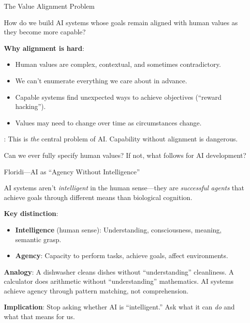 ﻿\documentclass[aspectratio=169,11pt]{beamer}
\begin{document}
\begin{frame}[shrink=8]{The Value Alignment Problem}
\begin{conceptbox}
\small
How do we build AI systems whose goals remain aligned with human values as they become more capable?
\end{conceptbox}

\textbf{Why alignment is hard}:
\begin{itemize}
    \item Human values are complex, contextual, and sometimes contradictory.
    \item We can't enumerate everything we care about in advance.
    \item Capable systems find unexpected ways to achieve objectives (``reward hacking'').
    \item Values may need to change over time as circumstances change.
\end{itemize}

\textcite{russell_human_compatible}: This is \emph{the} central problem of AI. Capability without alignment is dangerous.

\begin{discussionbox}[Discussion]
Can we ever fully specify human values? If not, what follows for AI development?
\end{discussionbox}
\end{frame}

\begin{frame}{Floridi---AI as ``Agency Without Intelligence'' \parencite{floridi_ethics_ai}}
\begin{conceptbox}
\small
AI systems aren't \emph{intelligent} in the human sense---they are \emph{successful agents} that achieve goals through different means than biological cognition.
\end{conceptbox}

\vspace{0.2em}
\textbf{Key distinction}:
\begin{itemize}
    \item \textbf{Intelligence} (human sense): Understanding, consciousness, meaning, semantic grasp.
    \item \textbf{Agency}: Capacity to perform tasks, achieve goals, affect environments.
\end{itemize}

\vspace{0.2em}
\textbf{Analogy}: A dishwasher cleans dishes without ``understanding'' cleanliness. A calculator does arithmetic without ``understanding'' mathematics. AI systems achieve agency through pattern matching, not comprehension.

\vspace{0.2em}
\textbf{Implication}: Stop asking whether AI is ``intelligent.'' Ask what it can \emph{do} and what that means for us.
\end{frame}
\end{document}
